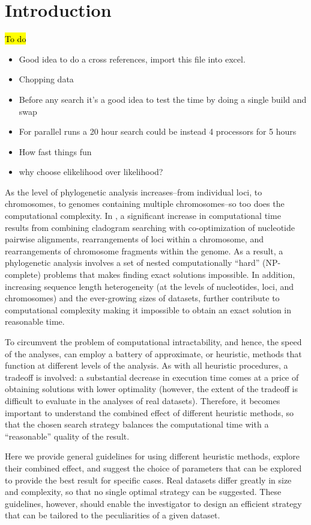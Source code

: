 \section{Introduction}

\hl{To do}
\begin{itemize}
\item{Good idea to do a cross references, import this file into excel.}
\item{Chopping data}
\item{Before any search it's a good idea to test the time by doing a single build and swap}
\item{For parallel runs a 20 hour search could be instead 4 processors for 5 hours}
\item{How fast things fun}
\item{why choose elikelihood over likelihood?}
\end{itemize}


As the level of phylogenetic analysis increases--from individual loci, to chromosomes, to genomes containing multiple 
chromosomes--so too does the computational complexity. In \poy, a significant increase in computational time results from 
combining cladogram searching with co-optimization of nucleotide pairwise alignments, 
rearrangements of loci within a chromosome, and rearrangements of chromosome fragments within the genome. 
As a result, a phylogenetic analysis involves a set of nested computationally ``hard'' (NP-complete) problems that 
makes finding exact solutions impossible. In addition, increasing sequence length heterogeneity (at the levels of 
nucleotides, loci, and chromosomes) and the ever-growing sizes of datasets, further contribute to computational 
complexity making it impossible to obtain an exact solution in reasonable time.

To circumvent the problem of computational intractability, and hence, the speed of the analyses, \poy can employ a 
battery of approximate, or heuristic, methods that function at different levels of the analysis. As with all heuristic procedures, 
a tradeoff is involved: a substantial decrease in execution time comes at a price of obtaining solutions with lower optimality 
(however, the extent of the tradeoff is difficult to evaluate in the analyses of real datasets). Therefore, it becomes important 
to understand the combined effect of different heuristic methods, so that the chosen search strategy balances the computational 
time with a ``reasonable'' quality of the result.

Here we provide general guidelines for using different heuristic methods, explore their combined effect, and suggest the 
choice of parameters that can be explored to provide the best result for specific cases. Real datasets differ greatly in size 
and complexity, so that no single optimal strategy can be suggested. These guidelines, however, should enable the 
investigator to design an efficient strategy that can be tailored to the peculiarities of a given dataset.

